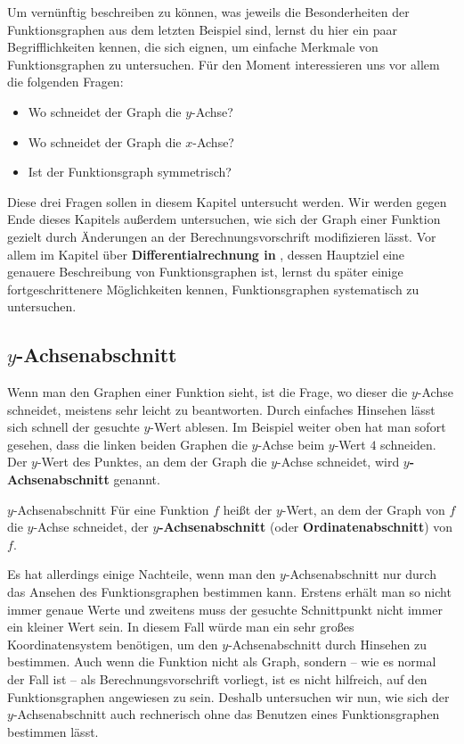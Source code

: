 \documentclass[../../main.tex]{subfiles}
\begin{document}
Um vernünftig beschreiben zu können, was jeweils die Besonderheiten der Funktionsgraphen aus dem letzten Beispiel sind, lernst du hier ein paar Begrifflichkeiten kennen, die sich eignen, um einfache Merkmale von Funktionsgraphen zu untersuchen. Für den Moment interessieren uns vor allem die folgenden Fragen:
\begin{itemize}[noitemsep]
    \item Wo schneidet der Graph die $y$-Achse?
    \item Wo schneidet der Graph die $x$-Achse?
    \item Ist der Funktionsgraph symmetrisch?
\end{itemize}

Diese drei Fragen sollen in diesem Kapitel untersucht werden. Wir werden gegen Ende dieses Kapitels außerdem untersuchen, wie sich der Graph einer Funktion gezielt durch Änderungen an der Berechnungsvorschrift modifizieren lässt. Vor allem im Kapitel über \textbf{Differentialrechnung in \Real}, dessen Hauptziel eine genauere Beschreibung von Funktionsgraphen ist, lernst du später einige fortgeschrittenere Möglichkeiten kennen, Funktionsgraphen systematisch zu untersuchen.

\subsection{$y$-Achsenabschnitt}
\label{sec:abbildungen_ordinatenabschnitt}

Wenn man den Graphen einer Funktion sieht, ist die Frage, wo dieser die $y$-Achse schneidet, meistens sehr leicht zu beantworten. Durch einfaches Hinsehen lässt sich schnell der gesuchte $y$-Wert ablesen. Im Beispiel weiter oben hat man sofort gesehen, dass die linken beiden Graphen die $y$-Achse beim $y$-Wert $4$ schneiden. Der $y$-Wert des Punktes, an dem der Graph die $y$-Achse schneidet, wird \textbf{$y$-Achsenabschnitt} genannt.

\begin{definition}{$y$-Achsenabschnitt}
    Für eine Funktion $f$ heißt der $y$-Wert, an dem der Graph von $f$ die $y$-Achse schneidet, der \textbf{$y$-Achsenabschnitt} (oder \textbf{Ordinatenabschnitt}) von $f$.
\end{definition}

Es hat allerdings einige Nachteile, wenn man den $y$-Achsenabschnitt nur durch das Ansehen des Funktionsgraphen bestimmen kann. Erstens erhält man so nicht immer genaue Werte und zweitens muss der gesuchte Schnittpunkt nicht immer ein kleiner Wert sein. In diesem Fall würde man ein sehr großes Koordinatensystem benötigen, um den $y$-Achsenabschnitt durch Hinsehen zu bestimmen. Auch wenn die Funktion nicht als Graph, sondern -- wie es normal der Fall ist -- als Berechnungsvorschrift vorliegt, ist es nicht hilfreich, auf den Funktionsgraphen angewiesen zu sein. Deshalb untersuchen wir nun, wie sich der $y$-Achsenabschnitt auch rechnerisch ohne das Benutzen eines Funktionsgraphen bestimmen lässt.
\end{document}
